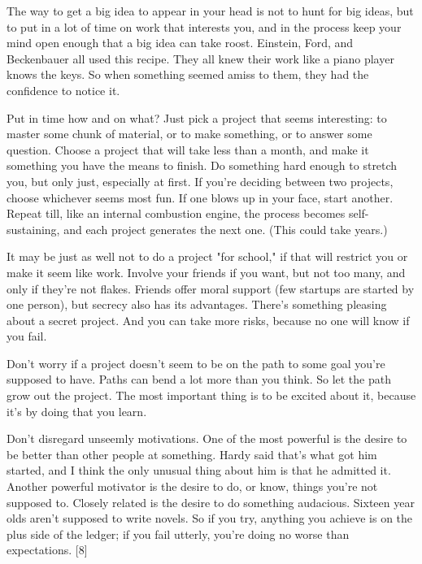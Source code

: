 The way to
                  get a big idea to appear in your head is not to hunt for big
                  ideas, but to put in a lot of time on work that interests you,
                  and in the process keep your mind open enough that a big idea
                  can take roost. Einstein, Ford, and Beckenbauer all used this
                  recipe. They all knew their work like a piano player knows the
                  keys. So when something seemed amiss to them, they had the
                  confidence to notice it.

Put in time how and on
                  what? Just pick a project that seems interesting: to master
                  some chunk of material, or to make something, or to answer
                  some question. Choose a project that will take less than a
                  month, and make it something you have the means to finish. Do
                  something hard enough to stretch you, but only just,
                  especially at first. If you're deciding between two projects,
                  choose whichever seems most fun. If one blows up in your face,
                  start another. Repeat till, like an internal combustion
                  engine, the process becomes self-sustaining, and each project
                  generates the next one. (This could take years.)

It
                  may be just as well not to do a project "for school," if that
                  will restrict you or make it seem like work. Involve your
                  friends if you want, but not too many, and only if they're not
                  flakes. Friends offer moral support (few startups are started
                  by one person), but secrecy also has its advantages. There's
                  something pleasing about a secret project. And you can take
                  more risks, because no one will know if you fail.

Don't
                  worry if a project doesn't seem to be on the path to some goal
                  you're supposed to have. Paths can bend a lot more than you
                  think. So let the path grow out the project. The most
                  important thing is to be excited about it, because it's by
                  doing that you learn.

Don't disregard unseemly
                  motivations. One of the most powerful is the desire to be
                  better than other people at something. Hardy said that's what
                  got him started, and I think the only unusual thing about him
                  is that he admitted it. Another powerful motivator is the
                  desire to do, or know, things you're not supposed to. Closely
                  related is the desire to do something audacious. Sixteen year
                  olds aren't supposed to write novels. So if you try, anything
                  you achieve is on the plus side of the ledger; if you fail
                  utterly, you're doing no worse than expectations. [8]

